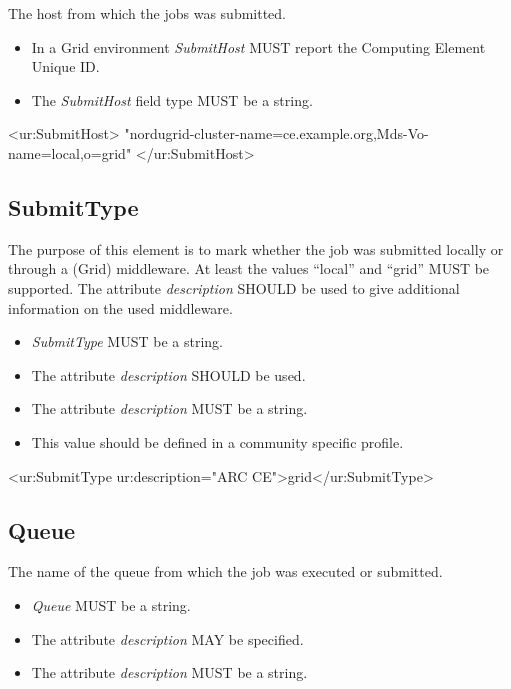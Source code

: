 The host from which the jobs was submitted.

\begin{itemize}
\item In a Grid environment \emph{SubmitHost} MUST report the Computing Element Unique ID. 
\item The \emph{SubmitHost} field type MUST be a string.
\end{itemize}

\begin{XMLexample}
<ur:SubmitHost>
   "nordugrid-cluster-name=ce.example.org,Mds-Vo-name=local,o=grid"
</ur:SubmitHost>
\end{XMLexample}






\subsection{SubmitType}

The purpose of this element is to mark whether the job was submitted locally or through a (Grid) middleware. At least the values ``local'' and ``grid'' MUST be supported. The attribute \emph{description} SHOULD be used to give additional information on the used middleware.
\begin{itemize}
\item \emph{SubmitType} MUST be a string.
\item The attribute \emph{description} SHOULD be used.
\item The attribute \emph{description} MUST be a string.
\item This value should be defined in a community specific profile.
\end{itemize}

\begin{XMLexample}
<ur:SubmitType ur:description="ARC CE">grid</ur:SubmitType>
\end{XMLexample}






\subsection{Queue}

The name of the queue from which the job was executed or submitted.
\begin{itemize}
\item \emph{Queue} MUST be a string.
\item The attribute \emph{description} MAY be specified.
\item The attribute \emph{description} MUST be a string.
\end{itemize}

